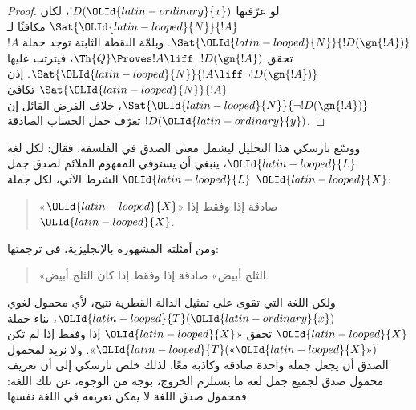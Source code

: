 \documentclass[../../../include/open-logic-section]{subfiles}
\begin{document}
\begin{proof}
لو عرّفتها $!D({\OLId{latin-ordinary}{x}})$، لكان $\Sat{{\OLId{latin-looped}{N}}}{!A}$ مكافئًا لـ
$\Sat{{\OLId{latin-looped}{N}}}{!D(\gn{!A})}$. وبلمّة النقطة الثابتة توجد جملة $!A$
تحقق $\Th{Q} \Proves !A \liff \lnot !D(\gn{!A})$،
فيترتب عليها $\Sat{{\OLId{latin-looped}{N}}}{!A \liff \lnot !D(\gn{!A})}$.
إذن $\Sat{{\OLId{latin-looped}{N}}}{!A}$ تكافئ $\Sat{{\OLId{latin-looped}{N}}}{\lnot !D(\gn{!A})}$،
خلاف الفرض القائل إن $!D({\OLId{latin-ordinary}{y}})$ تعرّف جمل الحساب الصادقة.
\end{proof}

ووسّع تارسكي هذا التحليل ليشمل معنى الصدق في الفلسفة.
فقال: لكل لغة ${\OLId{latin-looped}{L}}$، ينبغي أن يستوفي المفهوم الملائم لصدق جمل
${\OLId{latin-looped}{L}}$ الشرط الآتي، لكل جملة ${\OLId{latin-looped}{X}}$:
\begin{quote}
«${\OLId{latin-looped}{X}}$» صادقة إذا وفقط إذا ${\OLId{latin-looped}{X}}$.
\end{quote}
ومن أمثلته المشهورة بالإنجليزية، في ترجمتها:
\begin{quote}
«الثلج أبيض» صادقة إذا وفقط إذا كان الثلج أبيض.
\end{quote}
ولكن اللغة التي تقوى على تمثيل الدالة القطرية تتيح، لأي محمول
لغوي ${\OLId{latin-looped}{T}}({\OLId{latin-ordinary}{x}})$، بناء جملة ${\OLId{latin-looped}{X}}$ تحقق «${\OLId{latin-looped}{X}}$ إذا وفقط إذا لم تكن
${\OLId{latin-looped}{T}}(\text{«${\OLId{latin-looped}{X}}$»})$». ولا نريد لمحمول الصدق أن يجعل جملة واحدة
صادقة وكاذبة معًا. لذلك خلص تارسكي إلى أن تعريف محمول صدق
لجميع جمل لغة ما يستلزم الخروج، بوجه من الوجوه، عن تلك اللغة:
فمحمول صدق اللغة لا يمكن تعريفه في اللغة نفسها.
\end{document}
